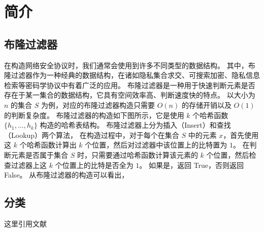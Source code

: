 
\chapter{简介}

\section{布隆过滤器}

在构造网络安全协议时，我们通常会使用到许多不同类型的数据结构。
其中，布隆过滤器作为一种经典的数据结构，在诸如隐私集合求交、可搜索加密、隐私信息检索等密码学协议中有着广泛的应用。
布隆过滤器是一种用于快速判断元素是否存在于某一集合的数据结构，它具有空间效率高、判断速度快的特点。
以大小为 $n$ 的集合 $S$ 为例，对应的布隆过滤器构造只需要 $O(n)$ 的存储开销以及 $O(1)$ 的判断复杂度。
布隆过滤器的构造如下图所示，它是使用 $k$ 个哈希函数 $\{h_1,\dots, h_k\}$ 构造的哈希表结构。
布隆过滤器上分为插入（Insert）和查找（Lookup）两个算法，
在构造过程中，对于每个在集合 $S$ 中的元素 $x$，首先使用这 $k$ 个哈希函数计算出 $k$ 个位置，然后对过滤器中该位置上的比特置为 $1$。
在判断元素是否属于集合 $S$ 时，只需要通过哈希函数计算该元素的 $k$ 个位置，然后检查过滤器上这 $k$ 个位置上的比特是否全为 $1$。
如果是，返回 True，否则返回 False。
从布隆过滤器的构造可以看出，


\section{分类}

这里引用文献~\cite{2024YinSiJiHeYunSuanZhongDeGuanJianShuJuJieGouYanJiu}
